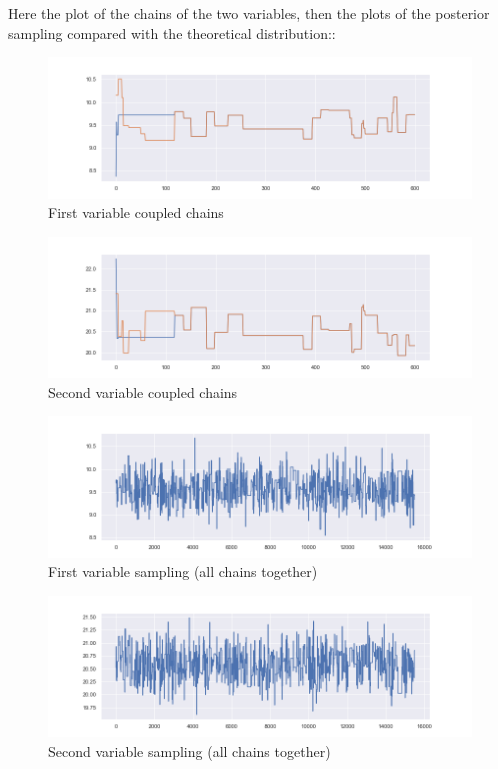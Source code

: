 \documentclass {article}
\begin{document}
Here the plot of the chains of the two variables, then the plots of the posterior sampling compared with the theoretical distribution::
\begin{figure}[h!]
	\centering
	\includegraphics[width=\textwidth]{immagini_abc_coupling_multivariate/coupling_abc_mult_chain_meeeting_1}	
	\caption{First variable coupled chains}
\end{figure}
\begin{figure}[h!]
	\centering
	\includegraphics[width=\textwidth]{immagini_abc_coupling_multivariate/coupling_abc_mult_chain_meeeting_2}	
	\caption{Second variable coupled chains}
\end{figure}

\begin{figure}[h!]
	\centering
	\includegraphics[width=\textwidth]{immagini_abc_coupling_multivariate/coupling_abc_mult_sampling_1}	
	\caption{First variable sampling (all chains together)}
\end{figure}
\begin{figure}[h!]
	\centering
	\includegraphics[width=\textwidth]{immagini_abc_coupling_multivariate/coupling_abc_mult_sampling_2}	
	\caption{Second variable sampling (all chains together)}
\end{figure}
\end{document}
